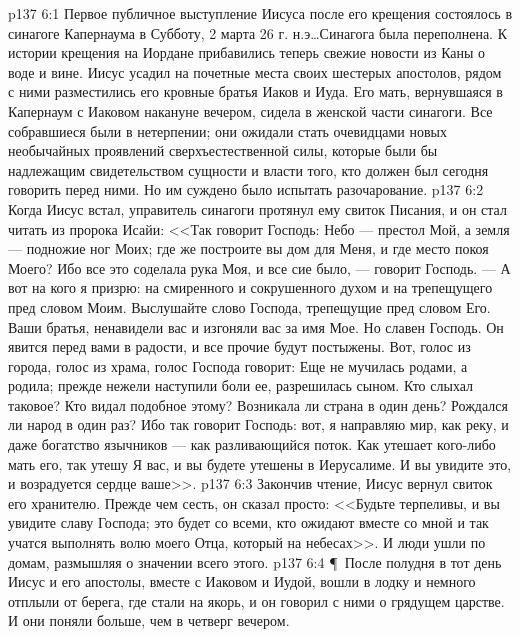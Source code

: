 \vs p137 6:1 Первое публичное выступление Иисуса после его крещения состоялось в синагоге Капернаума в Субботу, 2 марта 26 г. н.э\ldots  Синагога была переполнена. К истории крещения на Иордане прибавились теперь свежие новости из Каны о воде и вине. Иисус усадил на почетные места своих шестерых апостолов, рядом с ними разместились его кровные братья Иаков и Иуда. Его мать, вернувшаяся в Капернаум с Иаковом накануне вечером, сидела в женской части синагоги. Все собравшиеся были в нетерпении; они ожидали стать очевидцами новых необычайных проявлений сверхъестественной силы, которые были бы надлежащим свидетельством сущности и власти того, кто должен был сегодня говорить перед ними. Но им суждено было испытать разочарование.
\vs p137 6:2 Когда Иисус встал, управитель синагоги протянул ему свиток Писания, и он стал читать из пророка Исайи: <<Так говорит Господь: Небо --- престол Мой, а земля --- подножие ног Моих; где же построите вы дом для Меня, и где место покоя Моего? Ибо все это соделала рука Моя, и все сие было, --- говорит Господь. --- А вот на кого я призрю: на смиренного и сокрушенного духом и на трепещущего пред словом Моим. Выслушайте слово Господа, трепещущие пред словом Его. Ваши братья, ненавидели вас и изгоняли вас за имя Мое. Но славен Господь. Он явится перед вами в радости, и все прочие будут постыжены. Вот, голос из города, голос из храма, голос Господа говорит: Еще не мучилась родами, а родила; прежде нежели наступили боли ее, разрешилась сыном. Кто слыхал таковое? Кто видал подобное этому? Возникала ли страна в один день? Рождался ли народ в один раз? Ибо так говорит Господь: вот, я направляю мир, как реку, и даже богатство язычников --- как разливающийся поток. Как утешает кого\hyp{}либо мать его, так утешу Я вас, и вы будете утешены в Иерусалиме. И вы увидите это, и возрадуется сердце ваше>>.
\vs p137 6:3 Закончив чтение, Иисус вернул свиток его хранителю. Прежде чем сесть, он сказал просто: <<Будьте терпеливы, и вы увидите славу Господа; это будет со всеми, кто ожидают вместе со мной и так учатся выполнять волю моего Отца, который на небесах>>. И люди ушли по домам, размышляя о значении всего этого.
\vs p137 6:4 \P\ После полудня в тот день Иисус и его апостолы, вместе с Иаковом и Иудой, вошли в лодку и немного отплыли от берега, где стали на якорь, и он говорил с ними о грядущем царстве. И они поняли больше, чем в четверг вечером.
